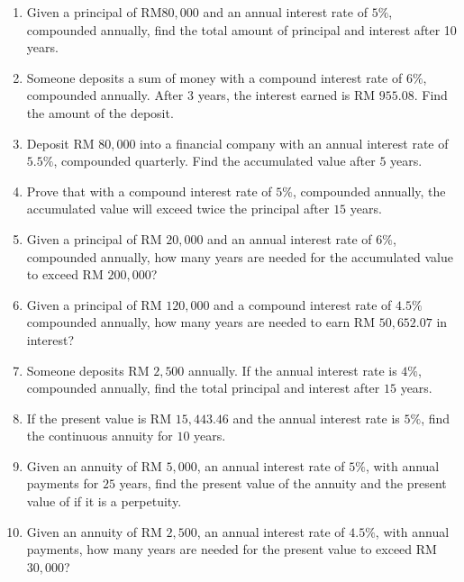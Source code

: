 \documentclass{report}
\begin{document}
        \newpage
    \begin{enumerate}
        \item Given a principal of $\mathrm{RM} 80,000$ and an annual interest rate of $5\%$, compounded annually, find the total amount of principal and interest after 10 years.

        \item Someone deposits a sum of money with a compound interest rate of $6\%$, compounded annually. After $3$ years, the interest earned is RM $955.08$. Find the amount of the deposit.
        
        \item Deposit RM $80,000$ into a financial company with an annual interest rate of $5.5\%$, compounded quarterly. Find the accumulated value after $5$ years.

        \item Prove that with a compound interest rate of $5\%$, compounded annually, the accumulated value will exceed twice the principal after $15$ years.

        \item Given a principal of RM $20,000$ and an annual interest rate of $6\%$, compounded annually, how many years are needed for the accumulated value to exceed RM $200,000$?

        \item Given a principal of RM $120,000$ and a compound interest rate of $4.5\%$ compounded annually, how many years are needed to earn RM $50,652.07$ in interest?

        \item Someone deposits RM $2,500$ annually. If the annual interest rate is $4\%$, compounded annually, find the total principal and interest after $15$ years.

        \item If the present value is RM $15,443.46$ and the annual interest rate is $5\%$, find the continuous annuity for $10$ years.

        \item Given an annuity of RM $5,000$, an annual interest rate of $5\%$, with annual payments for $25$ years, find the present value of the annuity and the present value of if it is a perpetuity.

        \item Given an annuity of RM $2,500$, an annual interest rate of $4.5\%$, with annual payments, how many years are needed for the present value to exceed RM $30,000$?
    \end{enumerate}
\end{document}
